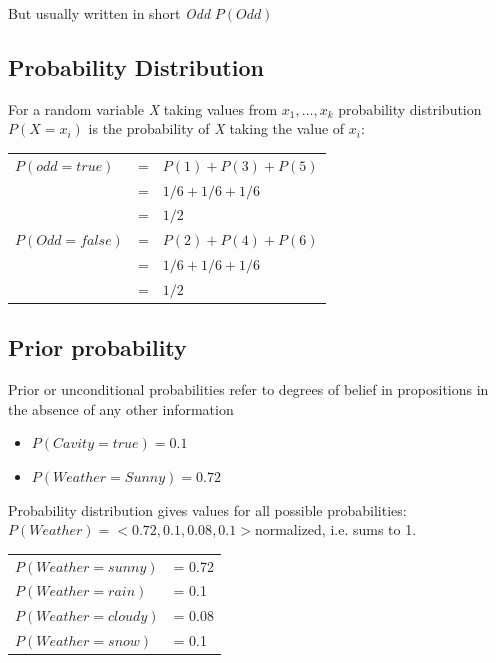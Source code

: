 But usually written in short \textit{Odd} $P(Odd)$

\subsection{Probability Distribution}
For a random variable \textit{X} taking values from $x_1, \dots, x_k$ probability distribution $P(X = x_i)$ is the probability of \textit{X} taking the value of $x_i$:\\

\begin{table}[h]
\centering
\begin{tabular}{l l l}
$P(odd = true)$ & = & $P(1) + P(3) + P(5)$ \\
 & = & $1/6 + 1/6 + 1/6$ \\
 & = & $1/2$ \\
 $P(Odd = false)$ & = & $P(2) + P(4) + P(6)$ \\
 & = & $1/6 + 1/6 + 1/6$\\
 & = & $1/2$
\end{tabular}
\end{table}

\subsection{Prior probability}
Prior or unconditional probabilities refer to degrees of belief in propositions in the absence of any other information\\

\begin{itemize}
\item $P(Cavity = true) = 0.1$
\item $P(Weather = Sunny) = 0.72$
\end{itemize}

Probability distribution gives values for all possible probabilities:\\
$P(Weather) = <0.72, 0.1, 0.08, 0.1> $normalized, i.e. sums to 1.\\

\begin{table}[h]
\centering
\begin{tabular}{l l}
$P(Weather = sunny)$ & = 0.72\\
$P(Weather = rain)$ & = 0.1\\
$P(Weather = cloudy)$ & = 0.08\\
$P(Weather = snow)$ & = 0.1
\end{tabular}
\end{table}


